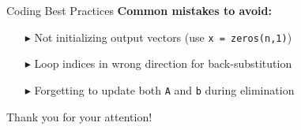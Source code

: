 \documentclass[aspectratio=169]{beamer}
\begin{document}
\begin{frame}{Coding Best Practices}
	\textbf{Common mistakes to avoid:}
	\begin{itemize}
		\item[$\blacktriangleright$]
		      Not initializing output vectors (use \texttt{x = zeros(n,1)})

		\item[$\blacktriangleright$]
		      Loop indices in wrong direction for back-substitution

		\item[$\blacktriangleright$]
		      Forgetting to update both \texttt{A} and \texttt{b} during elimination
	\end{itemize}
\end{frame}
{
\begin{frame}[standout]
	Thank you for your attention!
\end{frame}
}
\end{document}

